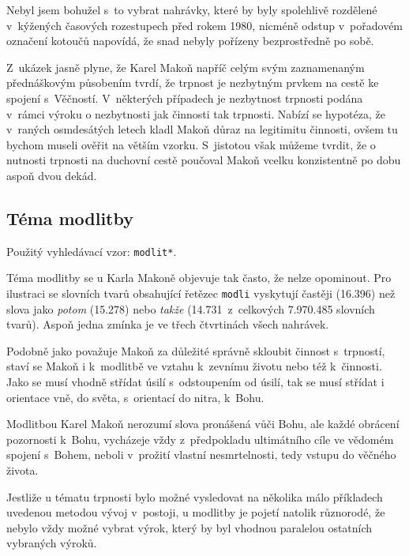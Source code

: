 Nebyl jsem bohužel s~to vybrat nahrávky, které by byly spolehlivě rozdělené
v~kýžených časových rozestupech před rokem 1980, nicméně odstup v~pořadovém
označení kotoučů napovídá, že snad nebyly pořízeny bezprostředně po sobě.

Z~ukázek jasně plyne, že Karel Makoň napříč celým svým zaznamenaným přednáškovým
působením tvrdí, že trpnost je nezbytným prvkem na cestě ke spojení s~Věčností.
V~některých případech je nezbytnost trpnosti podána v~rámci výroku o nezbytnosti
jak činnosti tak trpnosti. Nabízí se hypotéza, že v~raných osmdesátých letech
kladl Makoň důraz na legitimitu činnosti, ovšem tu bychom museli ověřit na
větším vzorku. S~jistotou však můžeme tvrdit, že o nutnosti trpnosti na duchovní
cestě poučoval Makoň vcelku konzistentně po dobu aspoň dvou dekád.

\subsection{Téma modlitby}

Použitý vyhledávací vzor: \texttt{modlit*}.

Téma modlitby se u Karla Makoně objevuje tak často, že nelze opominout. Pro
ilustraci se slovních tvarů obsahující řetězec \texttt{modli} vyskytují častěji
(16.396\texttimes) než slova jako \textit{potom} (15.278\texttimes) nebo
  \textit{takže} (14.731\texttimes~z~celkových 7.970.485 slovních tvarů). Aspoň
jedna zmínka je ve třech čtvrtinách všech nahrávek.

Podobně jako považuje Makoň za důležité správně skloubit činnost s~trpností,
staví se Makoň i k~modlitbě ve vztahu k~zevnímu životu nebo též k~činnosti. Jako
se musí vhodně střídat úsilí s~odstoupením od úsilí, tak se musí střídat i
orientace vně, do světa, s~orientací do nitra, k~Bohu.

Modlitbou Karel Makoň nerozumí slova pronášená vůči Bohu, ale každé obrácení
pozornosti k~Bohu, vycházeje vždy z~předpokladu ultimátního cíle ve vědomém
spojení s~Bohem, neboli v~prožití vlastní nesmrtelnosti, tedy vstupu do věčného
života.

Jestliže u tématu trpnosti bylo možné vysledovat na několika málo příkladech
uvedenou metodou vývoj v~postoji, u modlitby je pojetí natolik různorodé, že
nebylo vždy možné vybrat výrok, který by byl vhodnou paralelou ostatních
vybraných výroků.

